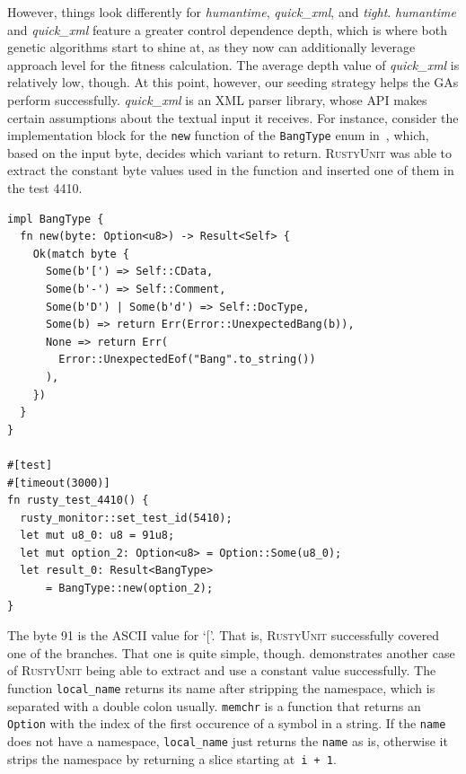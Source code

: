 \documentclass[paper=a4,%
  twoside,%
  BCOR4mm,%
  abstract=true,%
  toc=bibliography,%
  chapterprefix=true,%
  toc=bibliographynumbered,%
  open=right,%
  english,%
  pagesize=pdftex]{scrreprt}
\newcommand{\tech}{\textsc{RustyUnit}\xspace}
\begin{document}
However, things look differently for \emph{humantime}, \emph{quick\_xml}, and \emph{tight}. \emph{humantime} and \emph{quick\_xml} feature a greater control dependence depth, which is where both genetic algorithms start to shine at, as they now can additionally leverage approach level for the fitness calculation. The average depth value of \emph{quick\_xml} is relatively low, though. At this point, however, our seeding strategy helps the \acp{GA} perform successfully. \emph{quick\_xml} is an XML parser library, whose \ac{API} makes certain assumptions about the textual input it receives. For instance, consider the implementation block for the \texttt{new} function of the \texttt{BangType} enum in~, which, based on the input byte, decides which variant to return. \tech was able to extract the constant byte values used in the function and inserted one of them in the test 4410.

\begin{lstlisting}[style=boxed, caption={Enum \texttt{BangType} is part of the \emph{quick\_xml} crate}, label=lst:quick-xml-first-example]
impl BangType {
  fn new(byte: Option<u8>) -> Result<Self> {
    Ok(match byte {
      Some(b'[') => Self::CData,
      Some(b'-') => Self::Comment,
      Some(b'D') | Some(b'd') => Self::DocType,
      Some(b) => return Err(Error::UnexpectedBang(b)),
      None => return Err(
        Error::UnexpectedEof("Bang".to_string())
      ),
    })
  }
}

#[test]
#[timeout(3000)]
fn rusty_test_4410() {
  rusty_monitor::set_test_id(5410);
  let mut u8_0: u8 = 91u8;
  let mut option_2: Option<u8> = Option::Some(u8_0);
  let result_0: Result<BangType>
      = BangType::new(option_2);
}
\end{lstlisting}

The byte 91 is the ASCII value for `['. That is, \tech successfully covered one of the branches. That one is quite simple, though.  demonstrates another case of \tech being able to extract and use a constant value successfully. The function \texttt{local\_name} returns its name after stripping the namespace, which is separated with a double colon usually. \texttt{memchr} is a function that returns an \texttt{Option} with the index of the first occurence of a symbol in a string. If the \texttt{name} does not have a namespace, \texttt{local\_name} just returns the \texttt{name} as is, otherwise it strips the namespace by returning a slice starting at~\texttt{i + 1}.
\end{document}

